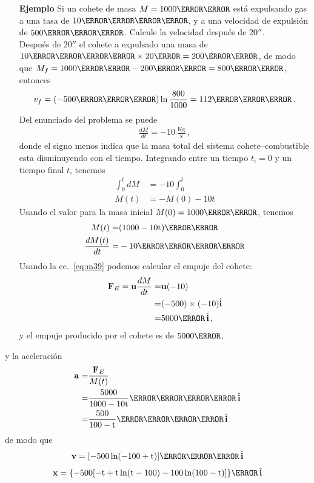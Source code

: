 \begin{itemize}
\item[\textbf{Ejemplo}]Si un cohete de masa $M=\unit{1000}{\kilo\gram}$ está expulsando gas a una tasa de $\unit{10}{\kilo\gram\per\second}$, y a una velocidad de expulsión de $\unit{500}{\meter\per\second}$. Calcule la velocidad después de $\unit{20}{\second}$.\\
Después de $\unit{20}{\second}$ el cohete a expulsado una masa de $\unit{10}{\kilo\gram\per\second}\timesm\unit{20}{\second}=\unit{200}{\kilo\gram}$, de modo que $M_f=\unit{1000}{\kilo\gram}-\unit{200}{\kilo\gram}=\unit{800}{\kilo\gram}$, entonces
\begin{align}
  v_f=(-\unit{500}{\meter\per\second})\ln\frac{800}{1000}=\unit{112}{\meter\per\second}\,.
\end{align}
Del enunciado del problema se puede 
\begin{align}
  \frac{dM}{dt}=-10\ \frac{\text{Kg}}{\text{s}}\,,
\end{align}
donde el signo menos indica que la masa total del sistema cohete--combustible esta disminuyendo con el tiempo. Integrando entre un tiempo $t_i=0$ y un tiempo final $t$, tenemos
\begin{align}
  \int_0^t dM&=-10\int_0^t\nonumber\\
  M(t)&=-M(0)-10 t
\end{align}
Usando el valor para la masa inicial $M(0)=\unit{1000}{\kilo\gram}$, tenemos
\begin{align*}
  M(t)=&\unit{(1000-10t)}{\kilo\gram}\nonumber\\
  \frac{dM(t)}{dt}=&-10\kilo\gram\per\second
\end{align*}
Usando la ec.~\eqref{eq:m39} podemos calcular el empuje del cohete:
\begin{align}
  \mathbf{F}_E=\mathbf{u}\frac{dM}{dt}=&\mathbf{u}(-10)\nonumber\\
  =&(-500)\timesm(-10)\hat{\mathbf{i}}\nonumber\\
  =&{5000}{\newton}\,\hat{\mathbf{i}}\,,
\end{align}
y  el empuje producido por el cohete es de ${5000}{\newton}$,  
\end{itemize}

y la aceleración
\begin{align}
  \mathbf{a}=&\frac{\mathbf{F}_E}{M(t)}\nonumber\\
  =&\unit{\frac{5000}{1000-10t}}{\meter\per\second\squared}\,\hat{\mathbf{i}}\nonumber\\
  =&\unit{\frac{500}{100-t}}{\meter\per\second\squared}\,\hat{\mathbf{i}}
\end{align}
de modo que
\begin{align}
  \textbf{v}=\unit{[-500\ln(-100+t)]}{\meter\per\second}\,\hat{\mathbf{i}}
\end{align}
\begin{align}
 \mathbf{x}=\unit{\{-500 [-t+t \ln (t-100)-100 \ln (100-t)]\}}{\meter}\,\hat{\mathbf{i}}
\end{align}


